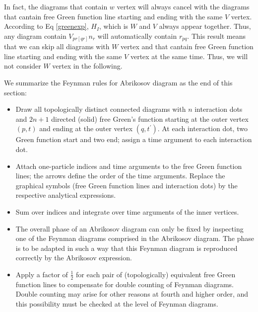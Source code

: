 In fact, the diagrams that contain $w$ vertex will always cancel with the diagrams that cantain free Green function line starting and ending with the same $V$ vertex.
According to Eq \ref{greenexp}, $H_I$, which is $W$ and $V$ always appear together.
Thus, any diagram contain $V_{pr[qr]}n_r$ will automatically contain $r_{pq}$.
This result means that we can skip all diagrams with $W$ vertex and that cantain free Green function line starting and ending with the same $V$ vertex at the same time.
Thus, we will not consider $W$ vertex in the following.

We summarize the Feynman rules for Abrikosov diagram as the end of this section:
\begin{itemize}
	\item Draw all topologically distinct connected diagrams with $n$ interaction dots and $2n + 1$ directed (solid) free Green’s function starting at the outer vertex $(p, t)$ and ending at the outer vertex $(q, t^{\prime})$.
		At each interaction dot, two Green function start and two end; assign a time argument to each interaction dot.
	\item Attach one-particle indices and time arguments to the free Green function lines; the arrows define the order of the time arguments. Replace the graphical symbols (free Green function lines and interaction dots) by the respective analytical expressions.
	\item Sum over indices and integrate over time arguments of the inner vertices.
	\item The overall phase of an Abrikosov diagram can only be fixed by inspecting one of the Feynman diagrams comprised in the Abrikosov diagram.
		The phase is to be adapted in such a way that this Feynman diagram is reproduced correctly by the Abrikosov expression.
	\item Apply a factor of $\frac{1}{2}$ for each pair of (topologically) equivalent free Green function lines to compensate for double counting of Feynman diagrams. Double counting may arise for other reasons at fourth and higher order, and this possibility must be checked at the level of Feynman diagrams.
\end{itemize}




